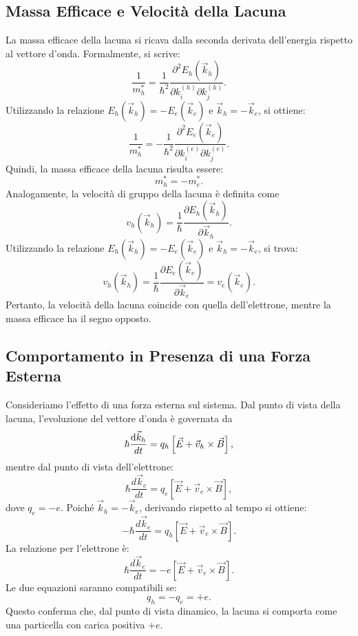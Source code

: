 \subsection*{Massa Efficace e Velocità della Lacuna}
La massa efficace della lacuna si ricava dalla seconda derivata dell'energia rispetto al vettore d'onda. Formalmente, si scrive:
\[
\frac{1}{m_h^*} = \frac{1}{\hbar^2} \frac{\partial^2 E_h(\vec{k}_h)}{\partial k_i^{(h)} \partial k_j^{(h)}}.
\]
Utilizzando la relazione \(E_h(\vec{k}_h) = -E_e(\vec{k}_e)\) e \(\vec{k}_h = - \vec{k}_e\), si ottiene:
\[
\frac{1}{m_h^*} = -\frac{1}{\hbar^2} \frac{\partial^2 E_e(\vec{k}_e)}{\partial k_i^{(e)} \partial k_j^{(e)}}.
\]
Quindi, la massa efficace della lacuna risulta essere:
\[
m_h^* = - m_e^*.
\]
Analogamente, la velocità di gruppo della lacuna è definita come
\[
v_h(\vec{k}_h) = \frac{1}{\hbar} \frac{\partial E_h(\vec{k}_h)}{\partial \vec{k}_h}.
\]
Utilizzando la relazione \(E_h(\vec{k}_h) = -E_e(\vec{k}_e)\) e \(\vec{k}_h = -\vec{k}_e\), si trova:
\[
v_h(\vec{k}_h) = \frac{1}{\hbar} \frac{\partial E_e(\vec{k}_e)}{\partial \vec{k}_e} = v_e(\vec{k}_e).
\]
Pertanto, la velocità della lacuna coincide con quella dell'elettrone, mentre la massa efficace ha il segno opposto.

\subsection*{Comportamento in Presenza di una Forza Esterna}

Consideriamo l'effetto di una forza esterna sul sistema. Dal punto di vista della lacuna, l'evoluzione del vettore d'onda è governata da
\[
\hbar \frac{\text{d}\vec{k}_h}{dt} = q_h \left[\vec{E} + \vec{v}_h \times \vec{B}\right],
\]
mentre dal punto di vista dell'elettrone:
\[
\hbar \frac{d\vec{k}_e}{dt} = q_e \left[\vec{E} + \vec{v}_e \times \vec{B}\right],
\]
dove \(q_e = -e\). Poiché \(\vec{k}_h = -\vec{k}_e\), derivando rispetto al tempo si ottiene:
\[
- \hbar \frac{d\vec{k}_e}{dt} = q_h \left[\vec{E} + \vec{v}_e \times \vec{B}\right].
\]
La relazione per l'elettrone è:
\[
\hbar \frac{d\vec{k}_e}{dt} = -e \left[\vec{E} + \vec{v}_e \times \vec{B}\right].
\]
Le due equazioni saranno compatibili se:
\[
q_h = -q_e = +e.
\]
Questo conferma che, dal punto di vista dinamico, la lacuna si comporta come una particella con carica positiva \(+e\).

